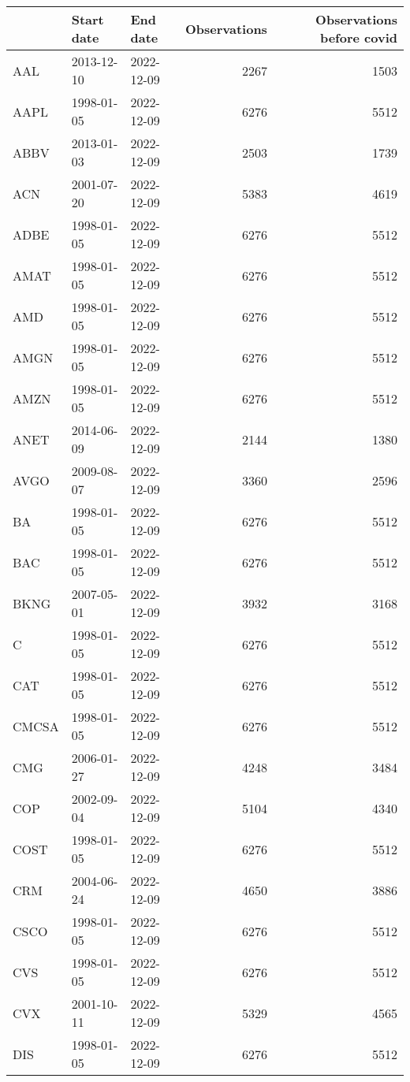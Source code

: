 \begin{table}[ht]
\centering
\begin{tabular}{lllrr}
  \hline
 & Start date & End date & Observations & Observations before covid \\ 
  \hline
AAL & 2013-12-10 & 2022-12-09 & 2267 & 1503 \\ 
  AAPL & 1998-01-05 & 2022-12-09 & 6276 & 5512 \\ 
  ABBV & 2013-01-03 & 2022-12-09 & 2503 & 1739 \\ 
  ACN & 2001-07-20 & 2022-12-09 & 5383 & 4619 \\ 
  ADBE & 1998-01-05 & 2022-12-09 & 6276 & 5512 \\ 
  AMAT & 1998-01-05 & 2022-12-09 & 6276 & 5512 \\ 
  AMD & 1998-01-05 & 2022-12-09 & 6276 & 5512 \\ 
  AMGN & 1998-01-05 & 2022-12-09 & 6276 & 5512 \\ 
  AMZN & 1998-01-05 & 2022-12-09 & 6276 & 5512 \\ 
  ANET & 2014-06-09 & 2022-12-09 & 2144 & 1380 \\ 
  AVGO & 2009-08-07 & 2022-12-09 & 3360 & 2596 \\ 
  BA & 1998-01-05 & 2022-12-09 & 6276 & 5512 \\ 
  BAC & 1998-01-05 & 2022-12-09 & 6276 & 5512 \\ 
  BKNG & 2007-05-01 & 2022-12-09 & 3932 & 3168 \\ 
  C & 1998-01-05 & 2022-12-09 & 6276 & 5512 \\ 
  CAT & 1998-01-05 & 2022-12-09 & 6276 & 5512 \\ 
  CMCSA & 1998-01-05 & 2022-12-09 & 6276 & 5512 \\ 
  CMG & 2006-01-27 & 2022-12-09 & 4248 & 3484 \\ 
  COP & 2002-09-04 & 2022-12-09 & 5104 & 4340 \\ 
  COST & 1998-01-05 & 2022-12-09 & 6276 & 5512 \\ 
  CRM & 2004-06-24 & 2022-12-09 & 4650 & 3886 \\ 
  CSCO & 1998-01-05 & 2022-12-09 & 6276 & 5512 \\ 
  CVS & 1998-01-05 & 2022-12-09 & 6276 & 5512 \\ 
  CVX & 2001-10-11 & 2022-12-09 & 5329 & 4565 \\ 
  DIS & 1998-01-05 & 2022-12-09 & 6276 & 5512 \\ 

\end{tabular}
\end{table}
